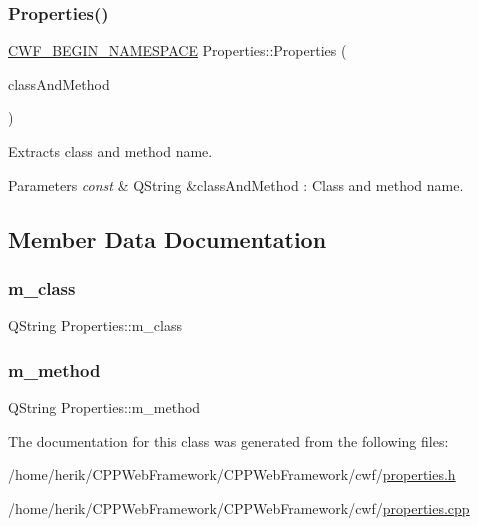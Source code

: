 \subsubsection{\texorpdfstring{Properties()}{Properties()}}
{\footnotesize\ttfamily \hyperlink{cppwebframework__global_8h_a7492e9498cbaf9cd17dbc2215d3a0e48}{C\+W\+F\+\_\+\+B\+E\+G\+I\+N\+\_\+\+N\+A\+M\+E\+S\+P\+A\+CE} Properties\+::\+Properties (\begin{DoxyParamCaption}\item[{const Q\+String \&}]{class\+And\+Method }\end{DoxyParamCaption})\hspace{0.3cm}{\ttfamily [explicit]}}



Extracts class and method name. 


\begin{DoxyParams}{Parameters}
{\em const} & Q\+String \&class\+And\+Method \+: Class and method name. \\
\hline
\end{DoxyParams}


\subsection{Member Data Documentation}
\mbox{\label{class_properties_a4efcf4114fb0d0163a0d6a6e894be7f3}} 
\subsubsection{\texorpdfstring{m\+\_\+class}{m\_class}}
{\footnotesize\ttfamily Q\+String Properties\+::m\+\_\+class}

\mbox{\label{class_properties_ae5f86c3cc9714e6d6dd13c8d693d3343}} 
\subsubsection{\texorpdfstring{m\+\_\+method}{m\_method}}
{\footnotesize\ttfamily Q\+String Properties\+::m\+\_\+method}



The documentation for this class was generated from the following files\+:\begin{DoxyCompactItemize}
\item 
/home/herik/\+C\+P\+P\+Web\+Framework/\+C\+P\+P\+Web\+Framework/cwf/\hyperlink{properties_8h}{properties.\+h}\item 
/home/herik/\+C\+P\+P\+Web\+Framework/\+C\+P\+P\+Web\+Framework/cwf/\hyperlink{properties_8cpp}{properties.\+cpp}\end{DoxyCompactItemize}
